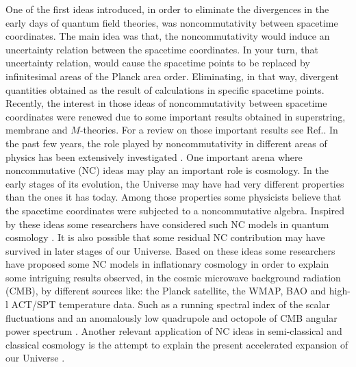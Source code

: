 \documentclass[12pt]{article}
\newcommand{\0}{{(0)}}
\newcommand{\1}{{(1)}}
\newcommand{\2}{{(2)}}
\begin{document}
One of the first ideas introduced, in order to eliminate the divergences in the early days
of quantum field theories, was noncommutativity between spacetime coordinates\cite{snyder}.
The main idea was that, the noncommutativity would induce an uncertainty relation
between the spacetime coordinates. In your turn, that uncertainty relation, would cause the
spacetime points to be replaced by infinitesimal areas of the Planck area order.
Eliminating, in that way, divergent quantities obtained as the result of calculations in
specific spacetime points.
Recently, the interest in those ideas of noncommutativity between spacetime coordinates were 
renewed due to some important results obtained in superstring, membrane and $M$-theories.
For a review on those important results see Ref.\cite{szabo}.
In the past few years, the role played by noncommutativity in different areas of physics has 
been extensively investigated \cite{banerjee}. 
One important arena where noncommutative (NC) ideas may play an important role 
is cosmology. In the early stages of its evolution, the Universe may have had
very different properties than the ones it has today. Among those properties
some physicists believe that the spacetime coordinates were subjected to a 
noncommutative algebra. Inspired by these ideas some researchers have considered 
such NC models in quantum cosmology 
\cite{garcia,nelson,barbosa,gil1}. It is also possible that some residual NC contribution 
may have survived in later stages of our Universe.  
Based on these ideas some 
researchers have proposed some NC models in inflationary cosmology in order to explain 
some intriguing results observed, in the cosmic microwave background radiation (CMB), by different 
sources like: the Planck satellite, the WMAP, BAO and high-l ACT/SPT temperature data. Such as a 
running spectral index of the scalar fluctuations and an anomalously low quadrupole and octopole 
of CMB angular power spectrum \cite{brandenberger}. 
Another relevant application of NC ideas in semi-classical and classical cosmology 
is the attempt to explain the present accelerated expansion of our Universe 
\cite{pedram,obregon,gil,gil2}.
\end{document}
